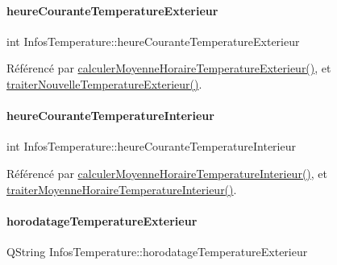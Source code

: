 \paragraph{\texorpdfstring{heure\+Courante\+Temperature\+Exterieur}{heureCouranteTemperatureExterieur}}
{\footnotesize\ttfamily int Infos\+Temperature\+::heure\+Courante\+Temperature\+Exterieur\hspace{0.3cm}{\ttfamily [private]}}



Référencé par \hyperlink{class_infos_temperature_a437325028225d765780b884614c47077}{calculer\+Moyenne\+Horaire\+Temperature\+Exterieur()}, et \hyperlink{class_infos_temperature_ab8d95f48c31ca17c8690849562268420}{traiter\+Nouvelle\+Temperature\+Exterieur()}.

\mbox{\label{class_infos_temperature_a708b70383d309fa0ba355dcc3921cc23}} 
\paragraph{\texorpdfstring{heure\+Courante\+Temperature\+Interieur}{heureCouranteTemperatureInterieur}}
{\footnotesize\ttfamily int Infos\+Temperature\+::heure\+Courante\+Temperature\+Interieur\hspace{0.3cm}{\ttfamily [private]}}



Référencé par \hyperlink{class_infos_temperature_a8cb8b9bef07506019ea6c9d91809af87}{calculer\+Moyenne\+Horaire\+Temperature\+Interieur()}, et \hyperlink{class_infos_temperature_a0311c8ce5730388f3baef752920d5abf}{traiter\+Moyenne\+Horaire\+Temperature\+Interieur()}.

\mbox{\label{class_infos_temperature_a5c3cd364746dc1cae5f9faee55c7555e}} 
\paragraph{\texorpdfstring{horodatage\+Temperature\+Exterieur}{horodatageTemperatureExterieur}}
{\footnotesize\ttfamily Q\+String Infos\+Temperature\+::horodatage\+Temperature\+Exterieur\hspace{0.3cm}{\ttfamily [private]}}



